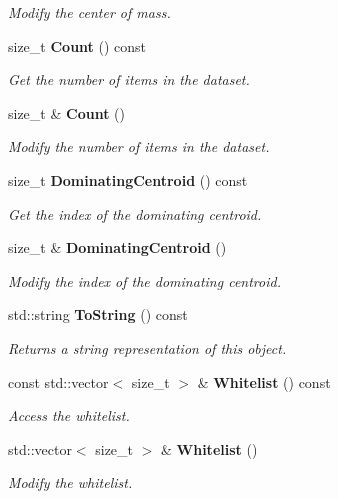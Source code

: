 \begin{DoxyCompactItemize}
\begin{DoxyCompactList}\small\item\em Modify the center of mass. \end{DoxyCompactList}\item 
size\-\_\-t {\bf Count} () const 
\begin{DoxyCompactList}\small\item\em Get the number of items in the dataset. \end{DoxyCompactList}\item 
size\-\_\-t \& {\bf Count} ()
\begin{DoxyCompactList}\small\item\em Modify the number of items in the dataset. \end{DoxyCompactList}\item 
size\-\_\-t {\bf Dominating\-Centroid} () const 
\begin{DoxyCompactList}\small\item\em Get the index of the dominating centroid. \end{DoxyCompactList}\item 
size\-\_\-t \& {\bf Dominating\-Centroid} ()
\begin{DoxyCompactList}\small\item\em Modify the index of the dominating centroid. \end{DoxyCompactList}\item 
std\-::string {\bf To\-String} () const 
\begin{DoxyCompactList}\small\item\em Returns a string representation of this object. \end{DoxyCompactList}\item 
const std\-::vector$<$ size\-\_\-t $>$ \& {\bf Whitelist} () const 
\begin{DoxyCompactList}\small\item\em Access the whitelist. \end{DoxyCompactList}\item 
std\-::vector$<$ size\-\_\-t $>$ \& {\bf Whitelist} ()
\begin{DoxyCompactList}\small\item\em Modify the whitelist. \end{DoxyCompactList}\end{DoxyCompactItemize}
